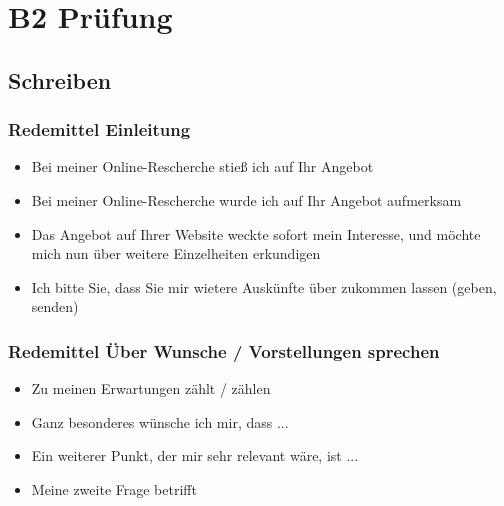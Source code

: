 \chapter{B2 Prüfung}

\section{Schreiben}

\subsection{Redemittel Einleitung}

\begin{itemize}
    \item Bei meiner Online-Rescherche stieß ich auf Ihr Angebot
    \item Bei meiner Online-Rescherche wurde ich auf Ihr Angebot aufmerksam
    \item Das Angebot auf Ihrer Website weckte sofort mein Interesse, und möchte mich nun über weitere Einzelheiten erkundigen
    \item Ich bitte Sie, dass Sie mir wietere Auskünfte über \akk zukommen lassen (geben, senden)
\end{itemize}

\subsection{Redemittel Über Wunsche / Vorstellungen sprechen}

\begin{itemize}
    \item Zu meinen Erwartungen zählt / zählen
    \item Ganz besonderes wünsche ich mir, dass ...
    \item Ein weiterer Punkt, der mir sehr relevant wäre, ist ...
    \item Meine zweite Frage betrifft \akk
\end{itemize}

